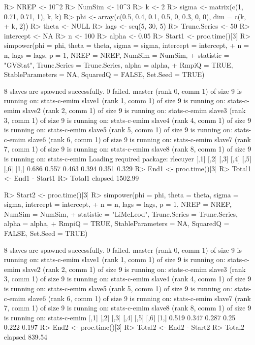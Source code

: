 \documentclass[article,nojss]{jss}
\begin{document}
\begin{Schunk}
\begin{Sinput}
R> NREP <- 10^2
R> NumSim <- 10^3
R> k <- 2
R> sigma <- matrix(c(1, 0.71, 0.71, 1), k, k)
R> phi <- array(c(0.5, 0.4, 0.1, 0.5, 0, 0.3, 0, 0), dim = c(k,
+     k, 2))
R> theta <- NULL
R> lags <- seq(5, 30, 5)
R> Trunc.Series <- 50
R> intercept <- NA
R> n <- 100
R> alpha <- 0.05
R> Start1 <- proc.time()[3]
R> simpower(phi = phi, theta = theta, sigma = sigma, intercept = intercept,
+     n = n, lags = lags, p = 1, NREP = NREP, NumSim = NumSim,
+     statistic = "GVStat", Trunc.Series = Trunc.Series, alpha = alpha,
+     RmpiQ = TRUE, StableParameters = NA, SquaredQ = FALSE, Set.Seed = TRUE)
\end{Sinput}
\begin{Soutput}
        8 slaves are spawned successfully. 0 failed.
master (rank 0, comm 1) of size 9 is running on: stats-c-emim 
slave1 (rank 1, comm 1) of size 9 is running on: stats-c-emim 
slave2 (rank 2, comm 1) of size 9 is running on: stats-c-emim 
slave3 (rank 3, comm 1) of size 9 is running on: stats-c-emim 
slave4 (rank 4, comm 1) of size 9 is running on: stats-c-emim 
slave5 (rank 5, comm 1) of size 9 is running on: stats-c-emim 
slave6 (rank 6, comm 1) of size 9 is running on: stats-c-emim 
slave7 (rank 7, comm 1) of size 9 is running on: stats-c-emim 
slave8 (rank 8, comm 1) of size 9 is running on: stats-c-emim 
Loading required package: rlecuyer
      [,1]  [,2]  [,3]  [,4]  [,5]  [,6]
[1,] 0.686 0.557 0.463 0.394 0.351 0.329
R> End1 <- proc.time()[3]
R> Total1 <- End1 - Start1
R> Total1  
elapsed 
1502.99 
\end{Soutput}
\begin{Sinput}
R> Start2 <- proc.time()[3]
R> simpower(phi = phi, theta = theta, sigma = sigma, intercept = intercept,
+     n = n, lags = lags, p = 1, NREP = NREP, NumSim = NumSim,
+     statistic = "LiMcLeod", Trunc.Series = Trunc.Series, alpha = alpha,
+     RmpiQ = TRUE, StableParameters = NA, SquaredQ = FALSE, Set.Seed = TRUE)
\end{Sinput}
\begin{Soutput}
        8 slaves are spawned successfully. 0 failed.
master (rank 0, comm 1) of size 9 is running on: stats-c-emim 
slave1 (rank 1, comm 1) of size 9 is running on: stats-c-emim 
slave2 (rank 2, comm 1) of size 9 is running on: stats-c-emim 
slave3 (rank 3, comm 1) of size 9 is running on: stats-c-emim 
slave4 (rank 4, comm 1) of size 9 is running on: stats-c-emim 
slave5 (rank 5, comm 1) of size 9 is running on: stats-c-emim 
slave6 (rank 6, comm 1) of size 9 is running on: stats-c-emim 
slave7 (rank 7, comm 1) of size 9 is running on: stats-c-emim 
slave8 (rank 8, comm 1) of size 9 is running on: stats-c-emim 
      [,1]  [,2]  [,3] [,4]  [,5]  [,6]
[1,] 0.519 0.347 0.287 0.25 0.222 0.197       
R> End2 <- proc.time()[3]
R> Total2 <- End2 - Start2
R> Total2
elapsed 
 839.54
 \end{Soutput}
 \end{Schunk}
 

\end{document}
